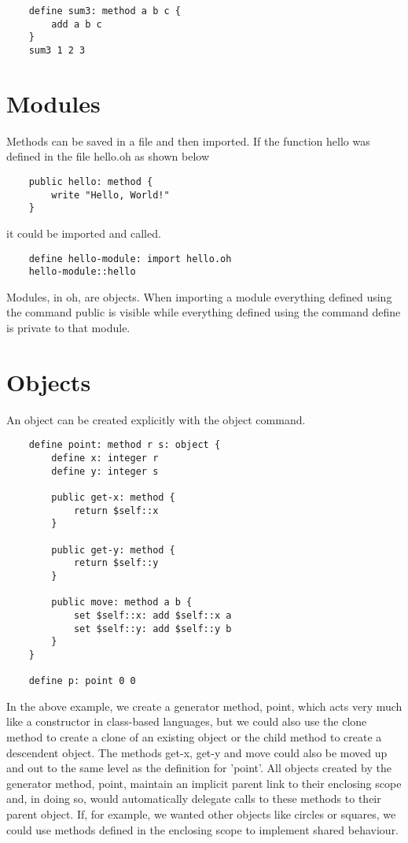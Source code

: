 \documentclass[12pt]{book}
\begin{document}
\begin{lstlisting}
	define sum3: method a b c {
		add a b c
	}
	sum3 1 2 3
\end{lstlisting}


\section{Modules}

Methods can be saved in a file and then imported. If the function hello
was defined in the file hello.oh as shown below

\begin{lstlisting}
	public hello: method {
		write "Hello, World!"
	}
\end{lstlisting}

it could be imported and called.

\begin{lstlisting}
	define hello-module: import hello.oh
	hello-module::hello
\end{lstlisting}

Modules, in oh, are objects. When importing a module everything defined
using the command public is visible while everything defined using the
command define is private to that module.


\section{Objects}
An object can be created explicitly with the object command.

\begin{lstlisting}
	define point: method r s: object {
		define x: integer r
		define y: integer s

		public get-x: method {
			return $self::x
		}

		public get-y: method {
			return $self::y
		}

		public move: method a b {
			set $self::x: add $self::x a
			set $self::y: add $self::y b
		}
	}

	define p: point 0 0
\end{lstlisting}

In the above example, we create a generator method, point, which acts
very much like a constructor in class-based languages, but we could also
use the clone method to create a clone of an existing object or the
child method to create a descendent object.  The methods get-x, get-y
and move could also be moved up and out to the same level as the
definition for 'point'. All objects created by the generator method,
point, maintain an implicit parent link to their enclosing scope and,
in doing so, would automatically delegate calls to these methods to their
parent object. If, for example, we wanted other objects like circles
or squares, we could use methods defined in the enclosing scope to
implement shared behaviour.
\end{document}
